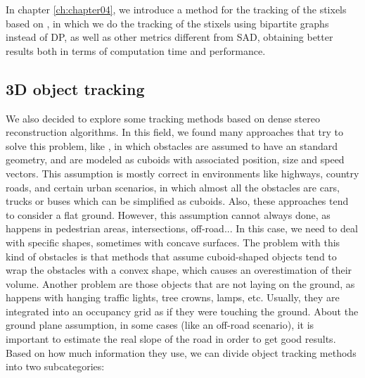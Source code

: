 In chapter \ref{ch:chapter04}, we introduce a method for the tracking of the stixels based on \cite{gunyel2012stixels}, in which we do the tracking of the stixels using bipartite graphs instead of \ac{DP}, as well as other metrics different from \ac{SAD}, obtaining better results both in terms of computation time and performance.

\subsection{3D object tracking}\label{ch:chapter00_02_05}

We also decided to explore some tracking methods based on dense stereo reconstruction algorithms. In this field, we found many approaches that try to solve this problem, like \cite{danescu2012particle}, in which obstacles are assumed to have an standard geometry, and are modeled as cuboids with associated position, size and speed vectors. This assumption is mostly correct in environments like highways, country roads, and certain urban scenarios, in which almost all the obstacles are cars, trucks or buses which can be simplified as cuboids. Also, these approaches tend to consider a flat ground.
However, this assumption cannot always done, as happens in pedestrian areas, intersections, off-road... In this case, we need to deal with specific shapes, sometimes with concave surfaces. The problem with this kind of obstacles is that methods that assume cuboid-shaped objects tend to wrap the obstacles with a convex shape, which causes an overestimation of their volume. Another problem are those objects that are not laying on the ground, as happens with hanging traffic lights, tree crowns, lamps, etc. Usually, they are integrated into an occupancy grid as if they were touching the ground. About the ground plane assumption, in some cases (like an off-road scenario), it is important to estimate the real slope of the road in order to get good results.
Based on how much information they use, we can divide object tracking methods into two subcategories:
